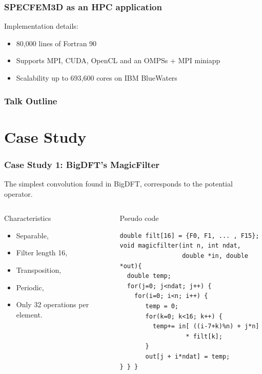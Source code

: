 \documentclass{beamer}
\begin{document}
\begin{frame}
\frametitle{SPECFEM3D as an HPC application}
\begin{block}{Implementation details:}
\begin{itemize}
\item 80,000 lines of Fortran 90
\item Supports MPI, CUDA, OpenCL and an OMPSs + MPI miniapp
\item Scalability up to 693,600 cores on IBM BlueWaters
\end{itemize}
\end{block}
\end{frame}


\begin{frame}
    \frametitle{Talk Outline}
    \tableofcontents[hideallsubsections,sections={2-}]
\end{frame}

\section{Case Study}


\begin{frame}[fragile]
\frametitle{Case Study 1: BigDFT's MagicFilter}
The simplest convolution found in BigDFT, corresponds to the potential operator.
\begin{columns}
\column{4cm}
\begin{block}{Characteristics}
\begin{itemize}
\item Separable,
\item Filter length 16,
\item Transposition,
\item Periodic,
\item Only 32 operations per element.
\end{itemize}
\end{block}
\column{6.2cm}
\begin{block}{Pseudo code}
\tiny
\lstset{language=C,numbers=left}
\begin{lstlisting}
double filt[16] = {F0, F1, ... , F15};
void magicfilter(int n, int ndat, 
                 double *in, double *out){
  double temp;
  for(j=0; j<ndat; j++) {
    for(i=0; i<n; i++) {
       temp = 0;
       for(k=0; k<16; k++) {
         temp+= in[ ((i-7+k)%n) + j*n] 
                  * filt[k];
       }
       out[j + i*ndat] = temp;
} } }
\end{lstlisting}
\end{block}
\end{columns}
\end{frame}
\end{document}

